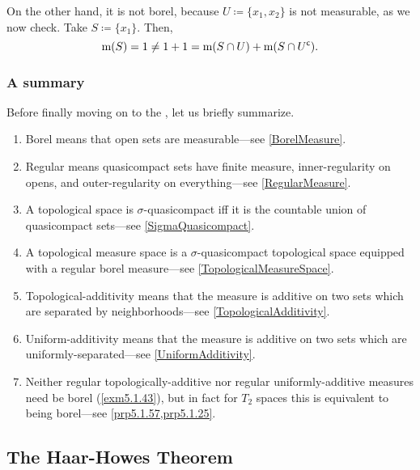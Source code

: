 \begin{exm}
On the other hand, it is not borel, because $U\coloneqq \{ x_1,x_2\}$ is not measurable, as we now check.  Take $S\coloneqq \{ x_1\}$.  Then,
\begin{equation}
\mathrm{m} (S)=1\neq 1+1=\mathrm{m} (S\cap U)+\mathrm{m} (S\cap U^{\mathsf{c}}).
\end{equation}
\end{exm}

\subsubsection{A summary}

Before finally moving on to the , let us briefly summarize.
\begin{enumerate}
\item Borel means that open sets are measurable---see \cref{BorelMeasure}.
\item Regular means quasicompact sets have finite measure, inner-regularity on opens, and outer-regularity on everything---see \cref{RegularMeasure}.
\item A topological space is $\sigma$-quasicompact iff it is the countable union of quasicompact sets---see \cref{SigmaQuasicompact}.
\item A topological measure space is a $\sigma$-quasicompact topological space equipped with a regular borel measure---see \cref{TopologicalMeasureSpace}.
\item Topological-additivity means that the measure is additive on two sets which are separated by neighborhoods---see \cref{TopologicalAdditivity}.
\item Uniform-additivity means that the measure is additive on two sets which are uniformly-separated---see \cref{UniformAdditivity}.
\item Neither regular topologically-additive nor regular uniformly-additive measures need be borel (\cref{exm5.1.43}), but in fact for $T_2$ spaces this is equivalent to being borel---see \cref{prp5.1.57,prp5.1.25}.
\end{enumerate}

\subsection{The Haar-Howes Theorem}

